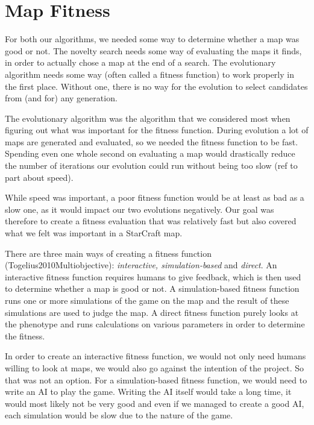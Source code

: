 \section{Map Fitness}
\label{methodology_mapfitness}

For both our algorithms, we needed some way to determine whether a map was good or not. The novelty search needs some way of evaluating the maps it finds, in order to actually chose a map at the end of a search. The evolutionary algorithm needs some way (often called a fitness function) to work properly in the first place. Without one, there is no way for the evolution to select candidates from (and for) any generation.

The evolutionary algorithm was the algorithm that we considered most when figuring out what was important for the fitness function. During evolution a lot of maps are generated and evaluated, so we needed the fitness function to be fast. Spending even one whole second on evaluating a map would drastically reduce the number of iterations our evolution could run without being too slow (ref to part about speed).

While speed was important, a poor fitness function would be at least as bad as a slow one, as it would impact our two evolutions negatively. Our goal was therefore to create a fitness evaluation that was relatively fast but also covered what we felt was important in a StarCraft map.

There are three main ways of creating a fitness function (Togelius2010Multiobjective): \textit{interactive, simulation-based} and \textit{direct}. An interactive fitness function requires humans to give feedback, which is then used to determine whether a map is good or not. A simulation-based fitness function runs one or more simulations of the game on the map and the result of these simulations are used to judge the map. A direct fitness function purely looks at the phenotype and runs calculations on various parameters in order to determine the fitness.

In order to create an interactive fitness function, we would not only need humans willing to look at maps, we would also go against the intention of the project. So that was not an option. For a simulation-based fitness function, we would need to write an AI to play the game. Writing the AI itself would take a long time, it would most likely not be very good and even if we managed to create a good AI, each simulation would be slow due to the nature of the game.


